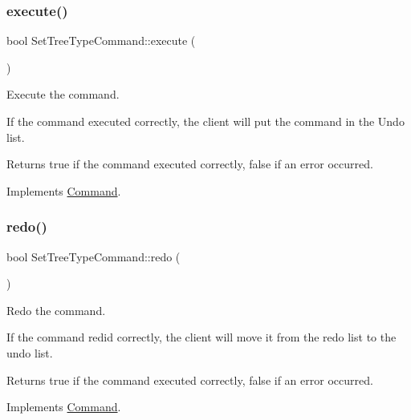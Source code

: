 \subsubsection{\texorpdfstring{execute()}{execute()}}
{\footnotesize\ttfamily bool Set\+Tree\+Type\+Command\+::execute (\begin{DoxyParamCaption}{ }\end{DoxyParamCaption})\hspace{0.3cm}{\ttfamily [virtual]}}



Execute the command. 

If the command executed correctly, the client will put the command in the Undo list. \begin{DoxyReturn}{Returns}
true if the command executed correctly, false if an error occurred. 
\end{DoxyReturn}


Implements \mbox{\hyperlink{class_command_a5d83cdea649a79d7b7253196a6deddeb}{Command}}.

\mbox{\label{class_set_tree_type_command_a16b5d34a58f58a5daad23f8c32fc14b4}} 
\subsubsection{\texorpdfstring{redo()}{redo()}}
{\footnotesize\ttfamily bool Set\+Tree\+Type\+Command\+::redo (\begin{DoxyParamCaption}{ }\end{DoxyParamCaption})\hspace{0.3cm}{\ttfamily [virtual]}}



Redo the command. 

If the command redid correctly, the client will move it from the redo list to the undo list. \begin{DoxyReturn}{Returns}
true if the command executed correctly, false if an error occurred. 
\end{DoxyReturn}


Implements \mbox{\hyperlink{class_command_ab222d875ec449c40467173edb28e5460}{Command}}.

\mbox{\label{class_set_tree_type_command_ac6538d32b00404cfca61d6f28bf7b854}} 

